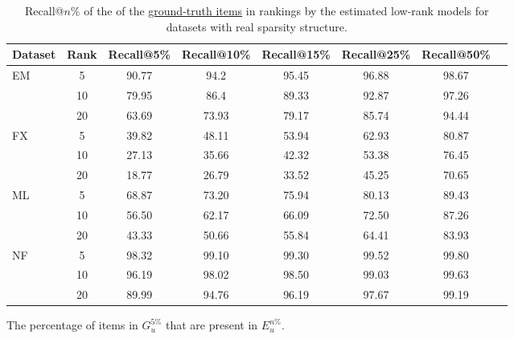 \begin{table}[bt]
  \centering
  \begin{threeparttable}
  \caption{Recall@$n$\%\tnote{\textasteriskcentered} of the \topf of the \underline{ground-truth items} in rankings by
    the estimated low-rank models for datasets with real sparsity structure.} 
  \label{table:gttop_table}
  \setlength{\tabcolsep}{.25em}
  \begin{tabular}{lcc*{5}{c}}
    \hline
    Dataset
    &\multicolumn{1}{p{1cm}}{\centering Rank}
    & Recall@5\% & Recall@10\% & Recall@15\% & Recall@25\% & Recall@50\% \\
    \hline
    \multirow{3}{*}{EM}  & \multirow{1}{*}{5} &  90.77 & 94.2 & 95.45 & 96.88 & 98.67\\
                          & \multirow{1}{*}{10} &  79.95 & 86.4 & 89.33 & 92.87 & 97.26\\ 
                          & \multirow{1}{*}{20} &  63.69 & 73.93 & 79.17 & 85.74 & 94.44\\ 
    \hline
    \multirow{3}{*}{FX}  & \multirow{1}{*}{5} & 39.82 & 48.11 & 53.94 & 62.93 & 80.87\\
                         & \multirow{1}{*}{10} & 27.13 & 35.66 & 42.32 & 53.38 & 76.45\\ 
                         & \multirow{1}{*}{20} & 18.77 & 26.79 & 33.52 & 45.25 & 70.65\\ 
    \hline
    \multirow{3}{*}{ML}  & \multirow{1}{*}{5} &  68.87 & 73.20 & 75.94 & 80.13 & 89.43\\
                          & \multirow{1}{*}{10} &  56.50 & 62.17 & 66.09 & 72.50 & 87.26\\ 
                          & \multirow{1}{*}{20} &  43.33 & 50.66 & 55.84 & 64.41 & 83.93\\ 
    \hline
    \multirow{3}{*}{NF}  & \multirow{1}{*}{5} &  98.32 & 99.10 & 99.30 & 99.52 & 99.80\\
                          & \multirow{1}{*}{10} &  96.19 & 98.02 & 98.50 & 99.03 & 99.63\\ 
                          & \multirow{1}{*}{20} &  89.99 & 94.76 & 96.19 & 97.67 & 99.19\\ 
    \hline
  \end{tabular}
  \begin{tablenotes}
  \item[\textasteriskcentered]The percentage of items in $G_{u}^{5\%}$ that are  present in $E_{u}^{n\%}$. 
  \end{tablenotes}
\end{threeparttable}
\end{table}


